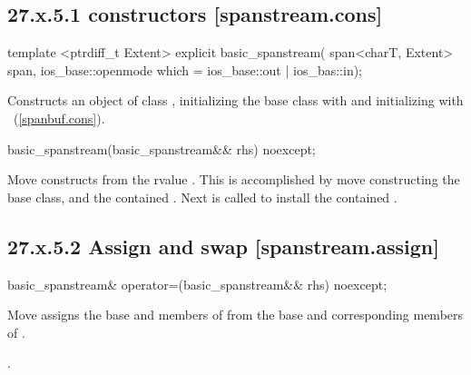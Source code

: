 \documentclass[ebook,11pt,article]{memoir}
\begin{document}
\subsection{27.x.5.1  constructors [spanstream.cons]}
\label{spanstream.cons}

\begin{itemdecl}
template <ptrdiff_t Extent>
explicit basic_spanstream(
  span<charT, Extent> span,
  ios_base::openmode which = ios_base::out | ios_bas::in);
\end{itemdecl}

\begin{itemdescr}
\pnum
\effects
Constructs an object of class
,
initializing the base class with
and initializing  with
~(\ref{spanbuf.cons}).
\end{itemdescr}

\begin{itemdecl}
basic_spanstream(basic_spanstream&& rhs) noexcept;
\end{itemdecl}

\begin{itemdescr}
\pnum
\effects Move constructs from the rvalue . This
is accomplished by move constructing the base class, and the contained
.
Next  is called to
install the contained .
\end{itemdescr}

\subsection{27.x.5.2 Assign and swap [spanstream.assign]}
\label{spanstream.assign}

\begin{itemdecl}
basic_spanstream& operator=(basic_spanstream&& rhs) noexcept;
\end{itemdecl}

\begin{itemdescr}
\pnum
\effects Move assigns the base and members of  from the base and corresponding
members of .

\pnum
\returns {}.
\end{itemdescr}
\end{document}
